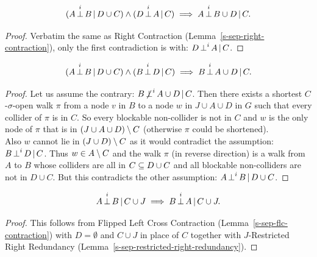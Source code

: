 \begin{Lem}
    \[ (A \operatorname*{\perp}^i  B \operatorname*{|} D \cup  C) \land (D \operatorname*{\perp}^i  A \operatorname*{|} C) \implies A  \operatorname*{\perp}^i  B \cup  D \operatorname*{|} C.\]
\begin{proof}
    Verbatim the same as Right Contraction (Lemma~\ref{s-sep-right-contraction}), 
    only the first contradiction is with: $D \operatorname*{\perp}^i A \operatorname*{|} C$.
\end{proof}
\end{Lem}

\begin{Lem}
    \label{s-sep-flc-contraction}
    \[ (A \operatorname*{\perp}^i  B \operatorname*{|} D \cup  C) \land (B \operatorname*{\perp}^i  D \operatorname*{|} C) \implies B \operatorname*{\perp}^i  A \cup  D \operatorname*{|} C.\]
\begin{proof}
    Let us assume the contrary:  $B  \operatorname*{\not\perp}^i  A \cup D \operatorname*{|} C$.
    Then there exists a shortest $C$-$\sigma$-open walk $\pi$ 
    from a node $v$ in $B$ to a node $w$ in $J \cup A \cup D$ in $G$ such that every collider of $\pi$ is in $C$.
    So every blockable non-collider is not in $C$ and $w$ is 
    the only node of $\pi$ that is in $(J \cup A \cup D)\setminus C$ (otherwise $\pi$ could be shortened). \\
    Also $w$ cannot lie in $(J \cup D) \setminus C$ as it would contradict the assumption: $B \operatorname*{\perp}^i  D \operatorname*{|} C$.
    Thus $w \in A \setminus C$ and the walk $\pi$ (in reverse direction) is a walk from $A$ to $B$ whose colliders are all in 
    $C \subseteq D \cup C$ 
    and all blockable non-colliders are not in $D \cup C$.
    But this contradicts the other assumption: $A \operatorname*{\perp}^i  B \operatorname*{|} D \cup  C$.
\end{proof}
\end{Lem}


\begin{Lem}
    \[A \operatorname*{\perp}^i  B \operatorname*{|} C \cup J \implies B \operatorname*{\perp}^i A \operatorname*{|} C \cup J.\]
\begin{proof}
  This follows from Flipped Left Cross Contraction (Lemma~\ref{s-sep-flc-contraction}) with $D=\emptyset$ and $C \cup J$ in place of $C$ together with
    $J$-Restricted Right Redundancy (Lemma~\ref{s-sep-restricted-right-redundancy}).
\end{proof}
\end{Lem}


